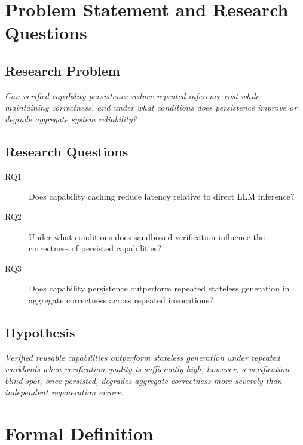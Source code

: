 \documentclass[conference]{IEEEtran}
\begin{document}
\section{Problem Statement and Research Questions}
\label{sec:problem}

\subsection{Research Problem}

\textit{Can verified capability persistence reduce repeated inference cost
while maintaining correctness, and under what conditions does persistence
improve or degrade aggregate system reliability?}

\subsection{Research Questions}

\begin{description}
  \item[RQ1] Does capability caching reduce latency relative to direct LLM
        inference?
  \item[RQ2] Under what conditions does sandboxed verification influence
        the correctness of persisted capabilities?
  \item[RQ3] Does capability persistence outperform repeated stateless
        generation in aggregate correctness across repeated invocations?
\end{description}

\subsection{Hypothesis}

\textit{Verified reusable capabilities outperform stateless generation
under repeated workloads when verification quality is sufficiently high;
however, a verification blind spot, once persisted, degrades aggregate
correctness more severely than independent regeneration errors.}

\section{Formal Definition}
\label{sec:formal}
\end{document}
